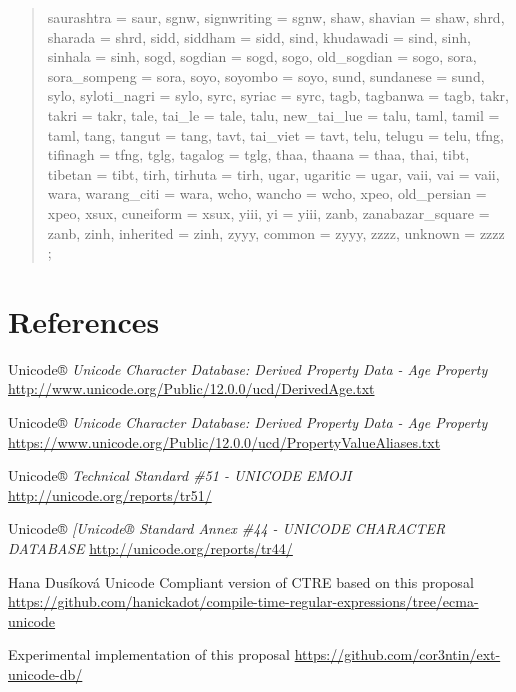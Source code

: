 \documentclass{wg21}
\begin{document}
\begin{quote}
\begin{itemdecl}
{    saurashtra = saur,
    sgnw,
    signwriting = sgnw,
    shaw,
    shavian = shaw,
    shrd,
    sharada = shrd,
    sidd,
    siddham = sidd,
    sind,
    khudawadi = sind,
    sinh,
    sinhala = sinh,
    sogd,
    sogdian = sogd,
    sogo,
    old_sogdian = sogo,
    sora,
    sora_sompeng = sora,
    soyo,
    soyombo = soyo,
    sund,
    sundanese = sund,
    sylo,
    syloti_nagri = sylo,
    syrc,
    syriac = syrc,
    tagb,
    tagbanwa = tagb,
    takr,
    takri = takr,
    tale,
    tai_le = tale,
    talu,
    new_tai_lue = talu,
    taml,
    tamil = taml,
    tang,
    tangut = tang,
    tavt,
    tai_viet = tavt,
    telu,
    telugu = telu,
    tfng,
    tifinagh = tfng,
    tglg,
    tagalog = tglg,
    thaa,
    thaana = thaa,
    thai,
    tibt,
    tibetan = tibt,
    tirh,
    tirhuta = tirh,
    ugar,
    ugaritic = ugar,
    vaii,
    vai = vaii,
    wara,
    warang_citi = wara,
    wcho,
    wancho = wcho,
    xpeo,
    old_persian = xpeo,
    xsux,
    cuneiform = xsux,
    yiii,
    yi = yiii,
    zanb,
    zanabazar_square = zanb,
    zinh,
    inherited = zinh,
    zyyy,
    common = zyyy,
    zzzz,
    unknown = zzzz
};
\end{itemdecl}


\end{quote}

\section{References}
\renewcommand{\section}[2]{}%
\begin{thebibliography}{9}
    Unicode®
    \emph{Unicode Character Database: Derived Property Data - Age Property}\newline
    \url{http://www.unicode.org/Public/12.0.0/ucd/DerivedAge.txt}

    Unicode®
    \emph{Unicode Character Database: Derived Property Data - Age Property}\newline
    \url{https://www.unicode.org/Public/12.0.0/ucd/PropertyValueAliases.txt}

    Unicode®
    \emph{Technical Standard \#51  - UNICODE EMOJI}\newline
    \url{http://unicode.org/reports/tr51/}

    Unicode®
    \emph{[Unicode® Standard Annex \#44 - UNICODE CHARACTER DATABASE}\newline
    \url{http://unicode.org/reports/tr44/}

    Hana Dusíková
    Unicode Compliant version of CTRE based on this proposal
    \url{https://github.com/hanickadot/compile-time-regular-expressions/tree/ecma-unicode}

    Experimental implementation of this proposal
    \url{https://github.com/cor3ntin/ext-unicode-db/}
\end{thebibliography}
\end{document}

